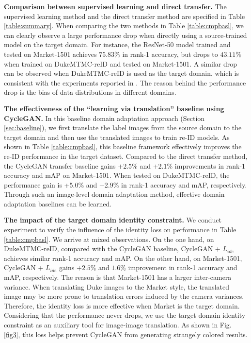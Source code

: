 \documentclass[10pt,twocolumn,letterpaper]{article}
\begin{document}
 \textbf{Comparison between  supervised learning and direct transfer.} The supervised learning method and the direct transfer method are specified in Table \ref{table:summary}. When comparing the two methods in Table \ref{table:cmpbasl}, we can clearly observe a large performance drop when directly using a source-trained model on the target domain. For instance,  
 the ResNet-50 model trained and tested on Market-1501 achieves $75.83\%$ in rank-1 accuracy, but drops to $43.11\%$ when trained on DukeMTMC-reID and tested on Market-1501. A similar drop can be observed when DukeMTMC-reID is used as the target domain, which is consistent with the experiments reported in \cite{fan17unsupervised}. The reason behind the performance drop is the bias of data distributions in different domains.

\textbf{The effectiveness of the ``learning via translation'' baseline using CycleGAN.} In this baseline domain adaptation approach (Section \ref{sec:baseline}), we first translate the label images from the source domain to the target domain and then use the translated images to train re-ID models. As shown in Table \ref{table:cmpbasl}, this baseline framework effectively improves the re-ID performance  in the target dataset. Compared to the direct transfer method, the CycleGAN transfer baseline gains $+2.5\%$ and $+2.1\%$ improvements in rank-1 accuracy and mAP on  Market-1501. When tested on DukeMTMC-reID, the performance gain is +5.0\% and +2.9\% in rank-1 accuracy and mAP, respectively.
{Through such an image-level domain adaptation method,   effective domain adaptation baselines can be learned.} 

\textbf{The impact of the target domain identity constraint.} 
We conduct experiment to verify the influence of the identity loss on performance in Table \ref{table:cmpbasl}.
We arrive at mixed observations. On the one hand, on DukeMTMC-reID, compared with the CycleGAN baseline, CycleGAN + $L_{ide}$ achieves similar rank-1 accuracy and mAP. On the other hand, on Market-1501, CycleGAN + $L_{ide}$ gains $+2.5\%$ and $1.6\%$ improvement in rank-1 accuracy and mAP, respectively. The reason is that Market-1501 has a larger inter-camera variance. When translating Duke images to the Market style, the translated image may be more prone to translation errors induced by the camera variances. Therefore, the identity loss is more effective when Market is the target domain. Considering that the performance never drops, we use the target domain identity constraint as an auxiliary tool for image-image translation. As shown in Fig. \ref{fig3}, this loss helps prevent CycleGAN from generating strangely colored results.
\end{document}
